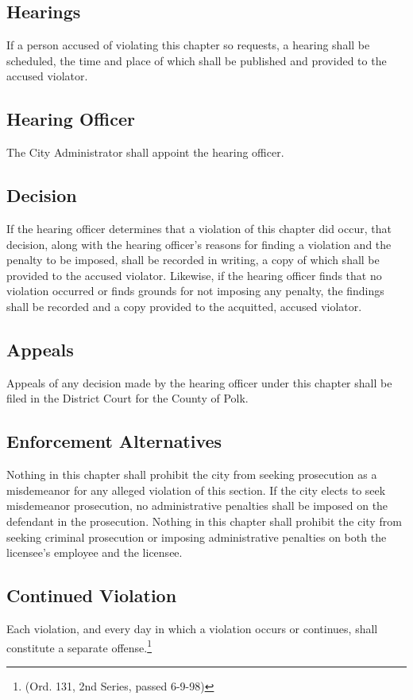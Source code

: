 \subsection{Hearings}
If a person accused of violating this chapter so requests, a hearing shall be scheduled, the time and place of which shall be published and provided to the accused violator.
\subsection{Hearing Officer}
The City Administrator shall appoint the hearing officer.
\subsection{Decision}
If the hearing officer determines that a violation of this chapter did occur, that decision, along with the hearing officer’s reasons for finding a violation and the penalty to be imposed, shall be recorded in writing, a copy of which shall be provided to the accused violator.  Likewise, if the hearing officer finds that no violation occurred or finds grounds for not imposing any penalty, the findings shall be recorded and a copy provided to the acquitted, accused violator.
\subsection{Appeals}
Appeals of any decision made by the hearing officer under this chapter shall be filed in the District Court for the County of Polk.
\subsection{Enforcement Alternatives}
Nothing in this chapter shall prohibit the city from seeking prosecution as a misdemeanor for any alleged violation of this section.  If the city elects to seek misdemeanor prosecution, no administrative penalties shall be imposed on the defendant in the prosecution.  Nothing in this chapter shall prohibit the city from seeking criminal prosecution or imposing administrative penalties on both the licensee’s employee and the licensee.
\subsection{Continued Violation}
Each violation, and every day in which a violation occurs or continues, shall constitute a separate offense.\footnote{(Ord. 131, 2nd Series, passed 6-9-98)}

